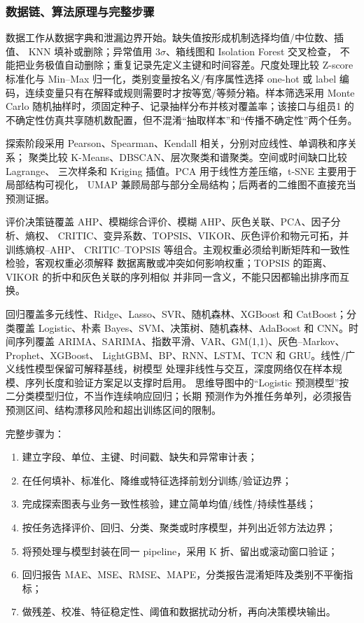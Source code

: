 \subsubsection{数据链、算法原理与完整步骤}

数据工作从数据字典和泄漏边界开始。缺失值按形成机制选择均值/中位数、插值、
KNN 填补或删除；异常值用 $3\sigma$、箱线图和 Isolation Forest 交叉检查，
不能把业务极值自动删除；重复记录先定义主键和时间容差。尺度处理比较
Z-score 标准化与 Min--Max 归一化，类别变量按名义/有序属性选择 one-hot 或
label 编码，连续变量只有在解释或规则需要时才按等宽/等频分箱。样本筛选采用
Monte Carlo 随机抽样时，须固定种子、记录抽样分布并核对覆盖率；该接口与组员1
的不确定性仿真共享随机数配置，但不混淆“抽取样本”和“传播不确定性”两个任务。

探索阶段采用 Pearson、Spearman、Kendall 相关，分别对应线性、单调秩和序关系；
聚类比较 K-Means、DBSCAN、层次聚类和谱聚类。空间或时间缺口比较 Lagrange、
三次样条和 Kriging 插值。PCA 用于线性方差压缩，t-SNE 主要用于局部结构可视化，
UMAP 兼顾局部与部分全局结构；后两者的二维图不直接充当预测证据。

评价决策链覆盖 AHP、模糊综合评价、模糊 AHP、灰色关联、PCA、因子分析、熵权、
CRITIC、变异系数、TOPSIS、VIKOR、灰色评价和物元可拓，并训练熵权--AHP、
CRITIC--TOPSIS 等组合。主观权重必须给判断矩阵和一致性检验，客观权重必须解释
数据离散或冲突如何影响权重；TOPSIS 的距离、VIKOR 的折中和灰色关联的序列相似
并非同一含义，不能只因都输出排序而互换。

回归覆盖多元线性、Ridge、Lasso、SVR、随机森林、XGBoost 和 CatBoost；分类覆盖
Logistic、朴素 Bayes、SVM、决策树、随机森林、AdaBoost 和 CNN。时间序列覆盖
ARIMA、SARIMA、指数平滑、VAR、GM(1,1)、灰色--Markov、Prophet、XGBoost、
LightGBM、BP、RNN、LSTM、TCN 和 GRU。线性/广义线性模型保留可解释基线，树模型
处理非线性与交互，深度网络仅在样本规模、序列长度和验证方案足以支撑时启用。
思维导图中的“Logistic 预测模型”按二分类模型归位，不当作连续响应回归；长期
预测作为外推任务单列，必须报告预测区间、结构漂移风险和超出训练区间的限制。

完整步骤为：
\begin{enumerate}
  \item 建立字段、单位、主键、时间戳、缺失和异常审计表；
  \item 在任何填补、标准化、降维或特征选择前划分训练/验证边界；
  \item 完成探索图表与业务一致性核验，建立简单均值/线性/持续性基线；
  \item 按任务选择评价、回归、分类、聚类或时序模型，并列出近邻方法边界；
  \item 将预处理与模型封装在同一 pipeline，采用 K 折、留出或滚动窗口验证；
  \item 回归报告 MAE、MSE、RMSE、MAPE，分类报告混淆矩阵及类别不平衡指标；
  \item 做残差、校准、特征稳定性、阈值和数据扰动分析，再向决策模块输出。
\end{enumerate}

